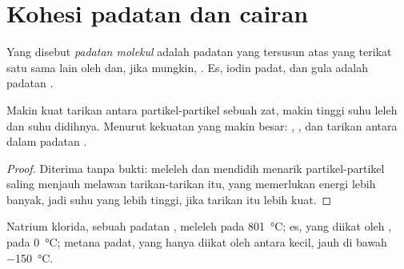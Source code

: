 \section{Kohesi padatan dan cairan}

\begin{definition}\label{def:g11:polarity-and-cohesion:molecular-solid}
Yang disebut \emph{padatan molekul} adalah
padatan yang tersusun atas  yang terikat satu sama lain
oleh  dan, jika mungkin, . Es,
iodin padat, dan gula adalah padatan .
\end{definition}

\begin{proposition}\label{prop:g11:polarity-and-cohesion:cohesion}
Makin kuat tarikan antara partikel-partikel sebuah zat, makin tinggi
suhu leleh dan suhu didihnya. Menurut kekuatan yang makin besar:
, , dan tarikan antara 
dalam padatan .
\end{proposition}

\begin{proof}
Diterima tanpa bukti: meleleh dan mendidih menarik partikel-partikel
saling menjauh melawan tarikan-tarikan itu, yang memerlukan energi lebih
banyak, jadi suhu yang lebih tinggi, jika tarikan itu lebih kuat.
\end{proof}

\begin{example}\label{ex:g11:polarity-and-cohesion:three}
Natrium klorida, sebuah padatan , meleleh pada \qty{801}{\celsius};
es, yang diikat oleh , pada \qty{0}{\celsius}; metana
padat, yang hanya diikat oleh  antara 
kecil, jauh di bawah \qty{-150}{\celsius}.
\end{example}

